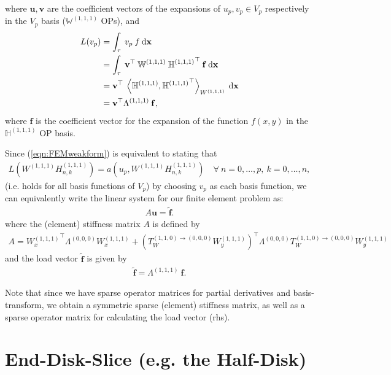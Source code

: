 \documentclass[11pt, oneside]{article}   	%
\newcommand{\hdop}{H}
\newcommand{\element}{\tau}
\newcommand{\Wiii}{W^{(1,1,1)}}
\newcommand{\hdopiii}{\hdop^{(1,1,1)}}
\newcommand{\bighdopiii}{{\mathbb{\hdop}^{(1,1,1)}}}
\newcommand{\bigWiii}{{\mathbb{W}^{(1,1,1)}}}
\begin{document}
where $\mathbf{u}, \mathbf{v}$ are the coefficient vectors of the expansions of $u_p, v_p \in V_p$ respectively in the $V_p$ basis ($\bigWiii$ OPs), and
\begin{align*}
	L(v_p) &= \int_\element \: v_p \: f \: \D \mathbf{x}\\
	&= \int_\element \: \mathbf{v}^\top \: \bigWiii \: \bighdopiii^\top \: \mathbf{f} \: \D \mathbf{x} \\
	&= \mathbf{v}^\top \: \ip< \bighdopiii, {\bighdopiii}^\top >_{\Wiii} \: \D \mathbf{x} \\
	&= \mathbf{v}^\top \Lambda^{(1,1,1)} \: \mathbf{f},
\end{align*}
where $\mathbf{f}$ is the coefficient vector for the expansion of the function $f(x,y)$ in the $\bighdopiii$ OP basis.

Since (\ref{eqn:FEMweakform}) is equivalent to stating that
\begin{align*}
	L(\Wiii \hdopiii_{n,k}) = a(u_p,\Wiii \hdopiii_{n,k}) \quad \forall \: n = 0,\dots,p, \: k = 0,\dots,n,
\end{align*}
(i.e. holds for all basis functions of $V_p$) by choosing $v_p$ as each basis function, we can equivalently write the linear system for our finite element problem as:
\begin{align*}
	A\mathbf{u} = \tilde{\mathbf{f}}.
\end{align*}
where the (element) stiffness matrix $A$ is defined by 
\begin{align*}
	A = {\Wiii_x}^\top \Lambda^{(0,0,0)} \Wiii_x + ({T_W^{(1,1,0)\to(0,0,0)} \Wiii_y})^\top \Lambda^{(0,0,0)} T_W^{(1,1,0)\to(0,0,0)} \Wiii_y
\end{align*}
and the load vector $\tilde{\mathbf{f}}$ is given by 
\begin{align*}
	\tilde{\mathbf{f}} = \Lambda^{(1,1,1)} \: \mathbf{f}.
\end{align*}

Note that since we have sparse operator matrices for partial derivatives and basis-transform, we obtain a symmetric sparse (element) stiffness matrix, as well as a sparse operator matrix for calculating the load vector (rhs).


\section{End-Disk-Slice (e.g. the Half-Disk)}\label{Appendix:HalfDisk}
\end{document}

